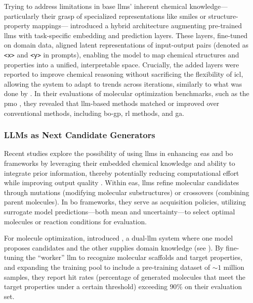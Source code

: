 Trying to address limitations in base \glspl{llm}’ inherent chemical knowledge---particularly their grasp of specialized representations like \gls{smiles} or structure-property mappings---\textcite{yu2025collaborative} introduced a hybrid architecture augmenting pre-trained \glspl{llm} with task-specific embedding and prediction layers. 
These layers, fine-tuned on domain data, aligned latent representations of input-output pairs (denoted as \texttt{<x>} and \texttt{<y>} in prompts), enabling the model to map chemical structures and properties into a unified, interpretable space. Crucially, the added layers were reported to improve chemical reasoning without sacrificing the flexibility of \gls{icl}, allowing the system to adapt to trends across iterations, similarly to what was done by \textcite{ramos2023bayesian}. 
In their evaluations of molecular optimization benchmarks, such as the \gls{pmo} \autocite{gao2022sample}, they revealed that \gls{llm}-based methods matched or improved over conventional methods, including \gls{bo}-\gls{gp}, \gls{rl} methods, and \gls{ga}.


\subsubsection{LLMs as Next Candidate Generators}

Recent studies explore the possibility of using \glspl{llm} in enhancing \glspl{ea} \autocite{lu2024generative} and \gls{bo} \autocite{amin2025towards} frameworks by leveraging their embedded chemical knowledge and ability to integrate prior information, thereby potentially reducing computational effort while improving output quality \autocite{lu2024generative}.
Within \glspl{ea}, \glspl{llm} refine molecular candidates through mutations (modifying molecular substructures) or crossovers (combining parent molecules). 
In \gls{bo} frameworks, they serve as acquisition policies, utilizing surrogate model predictions---both mean and uncertainty---to select optimal molecules or reaction conditions for evaluation.

For molecule optimization, \textcite{yu2025collaborative} introduced , a dual-\gls{llm} system where one model proposes candidates and the other supplies domain knowledge (see ). 
By fine-tuning the \enquote{worker} \gls{llm} to recognize molecular scaffolds and target properties, and expanding the training pool to include a pre-training dataset of $\sim1$ million samples, they report hit rates (percentage of generated molecules that meet the target properties under a certain threshold) exceeding $90\%$ on their evaluation set.


